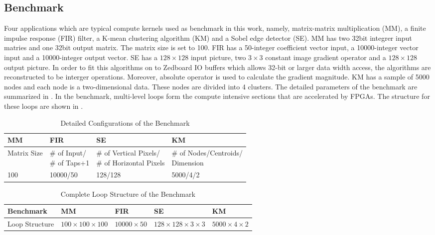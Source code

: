 \subsection{Benchmark}
Four applications which are typical compute kernels used as benchmark in this work, namely, matrix-matrix multiplication (MM), a finite impulse response (FIR) filter, a K-mean clustering algorithm (KM) and a Sobel edge detector (SE). MM has two 32bit integrer input matries and one 32bit output matrix. The matrix size is set to 100. FIR has a 50-integer coefficient vector input, a 10000-integer vector input and a 10000-integer output vector. SE has a $128 \times 128$ input picture, two $3 \times 3$ constant image gradient operator and a $128 \times 128$ output picture. In order to fit this algorithms on to Zedboard \cite{zedboard} IO buffers which allows 32-bit or larger data width access, the algorithms are reconstructed to be interger operations. Moreover, absolute operator is used to calculate the gradient magnitude. KM has a sample of 5000 nodes and each node is a two-dimensional data. These nodes are divided into 4 clusters. The detailed parameters of the benchmark are summarized in . In the benchmark, multi-level loops form the compute intensive sections that are accelerated by FPGAs. The structure for these loops are shown in .

\begin{table}[htb]
    \centering
    \caption{Detailed Configurations of the Benchmark \label{tab:benchmark-config}}{
        \centering
            \begin{tabular}{l|l|l|l}
                \hline
                MM & FIR & SE & KM \\ \hline
                Matrix Size & \tabincell{l}{\# of Input/\\ \# of Taps+1} & \tabincell{l}{ \# of Vertical Pixels/\\ \# of Horizontal Pixels} & \tabincell{l}{\# of Nodes/Centroids/\\Dimension} \\ \hline
                100 & 10000/50 & 128/128 & 5000/4/2  \\ \hline
            \end{tabular}
        }
\end{table}

\begin{table}
  \caption{Complete Loop Structure of the Benchmark \label{tab:loop-structure}}{
  \centering
  \begin{tabular}{l|l|l|l|l}
  \hline
  Benchmark & MM & FIR & SE & KM \\ \hline
  Loop Structure & $100 \times 100 \times 100$ & $10000 \times 50$ & $128 \times 128 \times 3 \times 3$ & $5000 \times 4 \times 2$  \\ \hline
  \end{tabular}
  }
\end{table}

